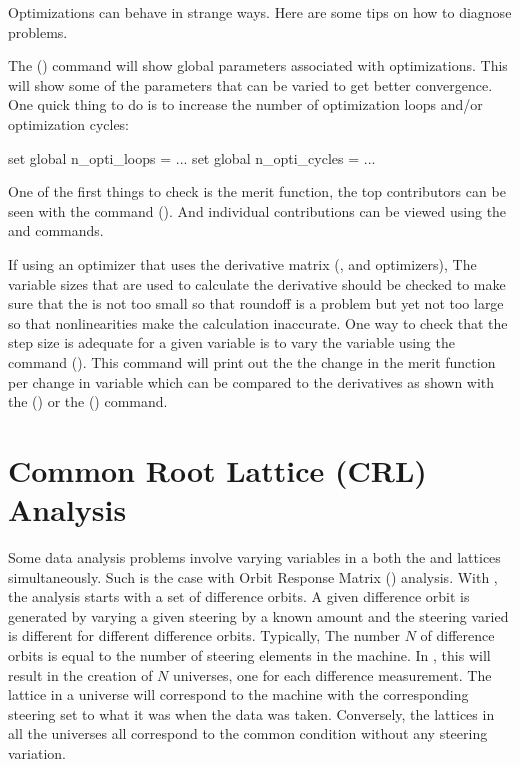 {{{{{{{{Optimizations can behave in strange ways. Here are some tips on how to diagnose problems.

The  () command will show global parameters
associated with optimizations. This will show some of the parameters that can be 
varied to get better convergence. One quick thing to do is to increase the number of
optimization loops and/or optimization cycles:
\begin{example}
	set global n_opti_loops = ...
	set global n_opti_cycles = ...
\end{example}

One of the first things to check is the merit function, the top contributors can be seen
with the command  (). And individual contributions
can be viewed using the  and  commands.

If using an optimizer that uses the derivative matrix (,  and 
 optimizers), The variable  sizes that are used to calculate the derivative
should be checked to make sure that the  is not too small so that roundoff is a problem
but yet not too large so that nonlinearities make the calculation inaccurate. One way to
check that the step size is adequate for a given variable is to vary the variable using
the command  (). This command will print out the the change
in the merit function per change in variable which can be compared to the derivatives 
as shown with the  () or the
 () command.

\section{Common Root Lattice (CRL) Analysis}
\label{s:crl}

Some data analysis problems involve varying variables in a both the
 and  lattices simultaneously. Such is the case
with Orbit Response Matrix () analysis\cite{b:orm}. With
, the analysis starts with a set of difference orbits. A given
difference orbit is generated by varying a given steering by a known
amount and the steering varied is different for different difference
orbits. Typically, The number $N$ of difference orbits is equal to the
number of steering elements in the machine. In \tao, this will result
in the creation of $N$ universes, one for each difference
measurement. The  lattice in a universe will correspond to
the machine with the corresponding steering set to what it was when
the data was taken. Conversely, the  lattices in all the
universes all correspond to the common condition without any steering
variation.

}}}}}}}}
